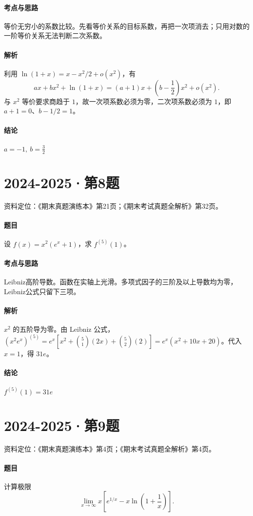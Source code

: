 \documentclass[UTF8,fontset=fandol,12pt,oneside,openany]{ctexrep}
\theoremstyle{definition}
\begin{document}
\paragraph{考点与思路}
等价无穷小的系数比较。先看等价关系的目标系数，再把一次项消去；只用对数的一阶等价关系无法判断二次系数。
\paragraph{解析}
利用 $\ln(1+x)=x-x^2/2+o(x^2)$，有 \[ax+bx^2+\ln(1+x)=(a+1)x+\left(b-\frac12\right)x^2+o(x^2).\]与 $x^2$ 等价要求商趋于 $1$，故一次项系数必须为零，二次项系数必须为 $1$，即 $a+1=0$、$b-1/2=1$。
\paragraph{结论}
$a=-1,\ b=\frac32$

\par\addvspace{18pt}\noindent\begin{minipage}{\linewidth}
\section{2024-2025·第8题}
\label{exam:08:q2}
资料定位：《期末真题演练本》第21页；《期末考试真题全解析》第32页。
\paragraph{题目}
设 $f(x)=x^2(e^x+1)$，求 $f^{(5)}(1)$。
\end{minipage}\par
\paragraph{考点与思路}
Leibniz高阶导数。函数在实轴上光滑。多项式因子的三阶及以上导数均为零，Leibniz公式只留下三项。
\paragraph{解析}
$x^2$ 的五阶导为零。由 Leibniz 公式，$(x^2e^x)^{(5)}=e^x[x^2+\binom51(2x)+\binom52(2)]=e^x(x^2+10x+20)$。代入 $x=1$，得 $31e$。
\paragraph{结论}
$f^{(5)}(1)=31e$

\par\addvspace{18pt}\noindent\begin{minipage}{\linewidth}
\section{2024-2025·第9题}
\label{exam:08:q3}
资料定位：《期末真题演练本》第4页；《期末考试真题全解析》第4页。
\paragraph{题目}
计算极限 \[\lim_{x\to\infty}x\left[e^{1/x}-x\ln\left(1+\frac1x\right)\right].\]
\end{minipage}\par
\end{document}

